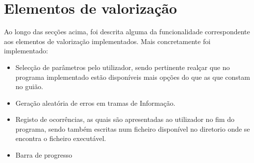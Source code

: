 \documentclass{article}
\begin{document}
\section{Elementos de valorização}
Ao longo das secções acima, foi descrita alguma da funcionalidade correspondente aos elementos de valorização implementados. Mais concretamente foi implementado:

\begin{itemize}
    \item Selecção de parâmetros pelo utilizador, sendo pertinente realçar que no programa implementado estão disponíveis mais opções do que as que constam no guião.
    \item Geração aleatória de erros em tramas de Informação.
    \item Registo de ocorrências, as quais são apresentadas ao utilizador no fim do programa, sendo também escritas num ficheiro disponível no diretorio onde se encontra o ficheiro executável.
    \item Barra de progresso %
\end{itemize}
\end{document}
